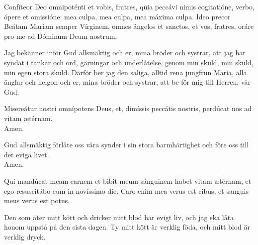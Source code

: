 \begin{multicols}{2}
\renewcommand{\columnseprulecolor}{\color{rubrica}}
\renewcommand{\columnseprule}{0.4pt}

Confíteor Deo omnipoténti et vobis, fratres, quia peccávi nimis cogitatióne,
verbo, ópere et omissióne: mea culpa, mea culpa, mea
máxima culpa. Ideo precor Beátam Maríam semper Vírginem, omnes
ángelos et sanctos, et vos, fratres, oráre pro me ad Dóminum Deum
nostrum.

\columnbreak

Jag bekänner inför Gud allsmäktig och er, mina bröder och systrar, att jag har syndat i tankar och ord, gärningar och underlåtelse, genom min skuld, min skuld, min egen stora skuld. Därför ber jag den saliga, alltid rena jungfrun Maria, alla änglar och helgon och er, mina bröder och systrar, att be för mig till Herren, vår Gud.

\end{multicols}

\smallskip
{}

\begin{multicols}{2}
\renewcommand{\columnseprulecolor}{\color{rubrica}}
\renewcommand{\columnseprule}{0.4pt}

\va Misereátur nostri omnípotens Deus, et, dimíssis peccátis nostris, perdúcat
nos ad vitam ætérnam.\\
\ra Amen.
\columnbreak

\va Gud allsmäktig förlåte oss våra synder i sin stora barmhärtighet och före oss till det eviga livet.\\
\ra Amen.
\end{multicols}

\smallskip
{}

\begin{multicols}{2}
\renewcommand{\columnseprulecolor}{\color{rubrica}}
\renewcommand{\columnseprule}{0.4pt}
Qui mandúcat meam carnem et bibit meum sánguinem habet vitam
ætérnam, et ego resuscitábo eum in novíssimo die. Caro enim mea
verus est cibus, et sanguis meus verus est potus.
\columnbreak

Den som äter mitt kött och dricker mitt blod har evigt liv, och jag ska låta honom uppstå på den sista dagen. Ty mitt kött är verklig föda, och mitt blod är verklig dryck.
\end{multicols}

\smallskip
{}

